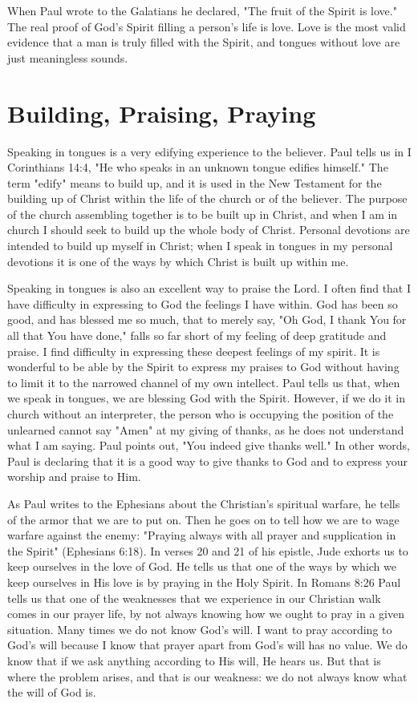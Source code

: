 When Paul wrote to the Galatians he declared, "The fruit of the Spirit is love." The real proof of God's Spirit filling a person's life is love. Love is the most valid evidence that a man is truly filled with the Spirit, and tongues without love are just meaningless sounds. 

\section*{Building, Praising, Praying}

Speaking in tongues is a very edifying experience to the believer. Paul tells us in I Corinthians 14:4, "He who speaks in an unknown tongue edifies himself." The term "edify" means to build up, and it is used in the New Testament for the building up of Christ within the life of the church or of the believer. The purpose of the church assembling together is to be built up in Christ, and when I am in church I should seek to build up the whole body of Christ. Personal devotions are intended to build up myself in Christ; when I speak in tongues in my personal devotions it is one of the ways by which Christ is built up within me. 

Speaking in tongues is also an excellent way to praise the Lord. I often find that I have difficulty in expressing to God the feelings I have within. God has been so good, and has blessed me so much, that to merely say, "Oh God, I thank You for all that You have done," falls so far short of my feeling of deep gratitude and praise. I find difficulty in expressing these deepest feelings of my spirit. It is wonderful to be able by the Spirit to express my praises to God without having to limit it to the narrowed channel of my own intellect. Paul tells us that, when we speak in tongues, we are blessing God with the Spirit. However, if we do it in church without an interpreter, the person who is occupying the position of the unlearned cannot say "Amen" at my giving of thanks, as he does not understand what I am saying. Paul points out, "You indeed give thanks well." In other words, Paul is declaring that it is a good way to give thanks to God and to express your worship and praise to Him. 

As Paul writes to the Ephesians about the Christian's spiritual warfare, he tells of the armor that we are to put on. Then he goes on to tell how we are to wage warfare against the enemy: "Praying always with all prayer and supplication in the Spirit" (Ephesians 6:18). In verses 20 and 21 of his epistle, Jude exhorts us to keep ourselves in the love of God. He tells us that one of the ways by which we keep ourselves in His love is by praying in the Holy Spirit. In Romans 8:26 Paul tells us that one of the weaknesses that we experience in our Christian walk comes in our prayer life, by not always knowing how we ought to pray in a given situation. Many times we do not know God's will. I want to pray according to God's will because I know that prayer apart from God's will has no value. We do know that if we ask anything according to His will, He hears us. But that is where the problem arises, and that is our weakness: we do not always know what the will of God is. 

